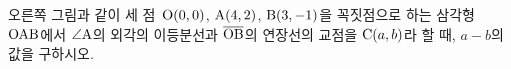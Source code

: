 \noindent\begin{minipage}[t]{0.58\linewidth}\vspace{0pt}\raggedright 오른쪽 그림과 같이 세 점~$\mathrm{O}(0{,}\mkern3mu\mathopen{}0)$, $\mathrm{A}(4{,}\mkern3mu\mathopen{}2)$, $\mathrm{B}(3{,}\mkern3mu\mathopen{}-1)$을 꼭짓점으로 하는 삼각형~$\mathrm{OAB}$에서 $\angle\mathrm{A}$의 외각의 이등분선과 $\overline{\mathrm{OB}}$의 연장선의 교점을 $\mathrm{C}(a{,}\mkern3mu\mathopen{}b)$라 할 때, $a-b$의 값을 구하시오.\end{minipage}\hfill\begin{minipage}[t]{0.4\linewidth}\vspace{0pt}\centering \resizebox{\ifdim\width>\linewidth\linewidth\else\width\fi}{!}{}\end{minipage}\par
